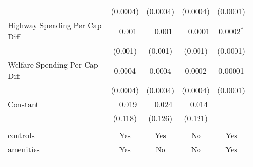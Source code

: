 \begin{table}[!htbp]
\begin{tabular}{@{\extracolsep{5pt}}lcccc}
  & (0.0004) & (0.0004) & (0.0004) & (0.0001) \\ 
  Highway Spending Per Cap Diff & $-$0.001 & $-$0.001 & $-$0.0001 & 0.0002$^{*}$ \\ 
  & (0.001) & (0.001) & (0.001) & (0.0001) \\ 
  Welfare Spending Per Cap Diff & 0.0004 & 0.0004 & 0.0002 & 0.00001 \\ 
  & (0.0004) & (0.0004) & (0.0004) & (0.0001) \\ 
  Constant & $-$0.019 & $-$0.024 & $-$0.014 &  \\ 
  & (0.118) & (0.126) & (0.121) &  \\ 
 \hline \\[-1.8ex] 
controls & Yes & Yes & No & Yes \\ 
amenities & Yes & No & No & Yes \\ 
\hline \\[-1.8ex] 
\hline 
\hline \\[-1.8ex] 
\end{tabular} 
\end{table} 
